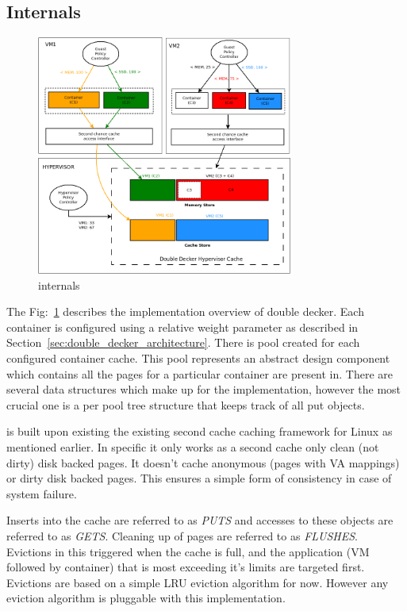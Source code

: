     \subsection{Internals}
    \label{sec:double_decker_internals}
    
      \begin{figure}
	\centering
	\includegraphics[width=0.75\textwidth]{images/background/single_level_implementation.png}
	\caption{\dd{} internals}
	\label{img:doube_decker_internals}
      \end{figure}
	  
	The Fig:~\ref{img:doube_decker_internals} describes the \tmem{} implementation overview of double decker. Each container is configured using a
	relative weight parameter as described in Section~\ref{sec:double_decker_architecture}. There is pool created for each configured container cache. This
	pool represents an abstract design component which contains all the pages for a particular container are present in. 
	There are several data structures which make up  for the \tmem implementation, however the most crucial one is a per pool tree structure that keeps 
	track of all put objects.
	
	\dd{} is built upon existing the existing \tmem{} second cache caching framework for Linux as mentioned earlier. In specific it only works as a second
	cache only clean (not dirty) disk backed pages. It doesn't cache anonymous (pages with VA mappings) or dirty disk backed pages. This ensures a simple 
	form of consistency in case of system failure. 
	
	Inserts into the cache are referred to as \textit{PUTS} and accesses to these objects are referred to as \textit{GETS}. Cleaning up of pages are referred
	to as \textit{FLUSHES}. Evictions in this triggered when the cache is full, and the application (VM followed by container) that is most exceeding it's 
	limits are targeted first. Evictions are based on a simple LRU eviction algorithm for now. However any eviction algorithm is pluggable with this implementation.
  
    
  
      

      